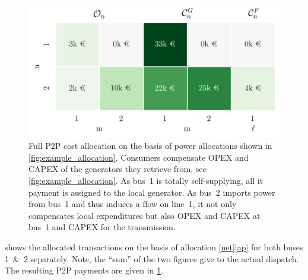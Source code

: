 \documentclass[11pt,twocolumn]{article}
\begin{document}
% 
\begin{figure}[h]
    \centering
    \includegraphics[width=\linewidth]{example_payoff_net_ebe.png}
    \caption{Full P2P cost allocation on the basis of power allocations shown in \cref{fig:example_allocation}. Consumers compensate OPEX and CAPEX of the generators they retrieve from, see \cref{fig:example_allocation}. As bus~1 is totally self-supplying, all it payment is assigned to the local generator.  As bus~2 imports power from bus~1 and thus induces a flow on line~1, it not only compensates local expenditures but also OPEX and CAPEX at bus~1 and CAPEX for the transmission.}
    \label{fig:example_payoff}
\end{figure}    
% 
% 
% 
 shows the allocated transactions on the basis of allocation \ref{net}\ref{ap} for both buses 1~\&~2 separately. Note, the ``sum'' of the two figures give to the actual dispatch. The resulting P2P payments are given in \cref{fig:example_payoff}.  
\end{document}
